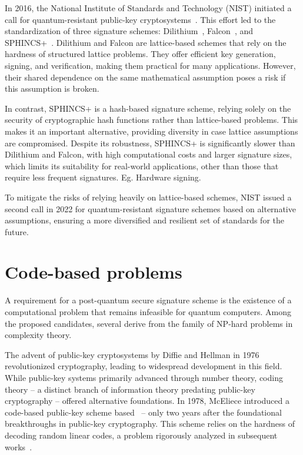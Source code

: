 \documentclass[11pt]{report}
\theoremstyle{definition}
\theoremstyle{plain}
\begin{document}
In 2016, the National Institute of Standards and Technology (NIST) initiated a call for quantum-resistant public-key cryptosystems~\cite{nistcall}. This effort led to the standardization of three signature schemes: Dilithium~\cite{ducas2018crystals}, Falcon~\cite{fouque2018falcon}, and SPHINCS+~\cite{bernstein2019sphincs+}. Dilithium and Falcon are lattice-based schemes that rely on the hardness of structured lattice problems. They offer efficient key generation, signing, and verification, making them practical for many applications. However, their shared dependence on the same mathematical assumption poses a risk if this assumption is broken.

In contrast, SPHINCS+ is a hash-based signature scheme, relying solely on the security of cryptographic hash functions rather than lattice-based problems. This makes it an important alternative, providing diversity in case lattice assumptions are compromised. Despite its robustness, SPHINCS+ is significantly slower than Dilithium and Falcon, with high computational costs and larger signature sizes, which limits its suitability for real-world applications, other than those that require less frequent signatures. Eg. Hardware signing.

To mitigate the risks of relying heavily on lattice-based schemes, NIST issued a second call in 2022 for quantum-resistant signature schemes based on alternative assumptions, ensuring a more diversified and resilient set of standards for the future.


\section{Code-based problems}

A requirement for a post-quantum secure signature scheme is the existence of a computational problem that remains infeasible for quantum computers. Among the proposed candidates, several derive from the family of NP-hard problems in complexity theory.

The advent of public-key cryptosystems by Diffie and Hellman in 1976 revolutionized cryptography, leading to widespread development in this field. While public-key systems primarily advanced through number theory, coding theory -- a distinct branch of information theory predating public-key cryptography -- offered alternative foundations. In 1978, McEliece introduced a code-based public-key scheme based~\cite{mceliece1978public} -- only two years after the foundational breakthroughs in public-key cryptography. This scheme relies on the hardness of decoding random linear codes, a problem rigorously analyzed in subsequent works~\cite{berlekamp1978inherent}.
\end{document}

